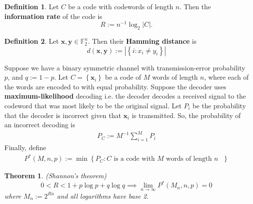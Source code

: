 \documentclass{article}
\renewcommand{\tt}[1]{\text{ #1 }}
\newcommand{\F}{\mathbb{F}}
\renewcommand{\=}{\equiv}
\renewcommand{\i}{^{-1}}
\newcommand{\ra}{\rightarrow}
\newcommand{\set}[1]{\left\{ #1 \right\}}
\renewcommand{\v}{\mathbf}
\newcommand{\x}{{\v x}}
\newcommand{\y}{{\v y}}
\theoremstyle{plain}
\newtheorem{thm}{Theorem}[subsection]
\theoremstyle{definition}
\newtheorem{defn}{Definition}[subsection]
\begin{document}
\begin{defn} \label{eq:defR}
Let $C$ be a code with codewords of length $n$. Then the \textbf{information rate} of the code is
$$ R := n\i \log_2 |C|. $$
\end{defn}

\begin{defn}
Let $\x, \y \in \F_2^n$. Then their \textbf{Hamming distance} is
$$ d(\x, \y) := |\set{ i : x_i \neq y_i }| $$

Suppose we have a binary symmetric channel with transmission-error probability $p$, and $q := 1 - p$.
Let $C = \set{ \x_i }$ be a code of $M$ words of length $n$, where each of the words are encoded to with equal probability.
Suppose the decoder uses \textbf{maximum-likelihood} decoding i.e. the decoder decodes a received signal to the codeword that was most likely to be the original signal.
Let $P_i$ be the probability that the decoder is incorrect given that $\x_i$ is transmitted.
So, the probability of an incorrect decoding is
\begin{align}
  P_C := M\i \sum_{i=1}^M P_i
\end{align}
Finally, define
\begin{align}
  P^*(M, n, p) := \min\set{ P_C : C \tt{is a code with $M$ words of length $n$} }
\end{align}
\end{defn}

\begin{thm}
  (Shannon's theorem)
  $$
  0 < R < 1 + p \log p + q \log q
  \implies \lim_{n \ra \infty} P^*(M_n, n, p) = 0
  $$
  where $M_n := 2^{Rn}$ and all logarithms have base 2.
\end{thm}
\end{document}
